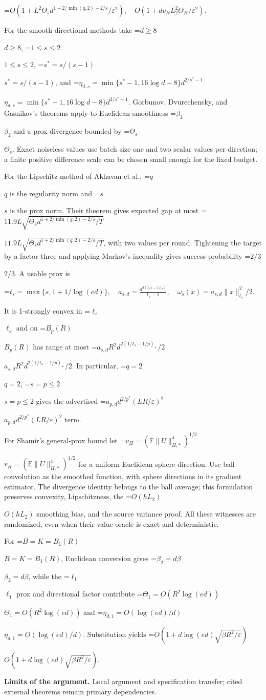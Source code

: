 \documentclass[10pt,a4paper]{article}
\newcommand{\AtlasMath}[1]{\par\begingroup\centering\setbox0=\hbox{$\displaystyle #1$}\ifdim\wd0>1.4\linewidth\typeout{ATLAS WIDE FORMULA: \the\wd0}\fi\ifdim\wd0>\linewidth\resizebox{\linewidth}{!}{\box0}\else\box0\fi\par\endgroup}
\newcommand{\AtlasInlineMath}[1]{\begingroup\setbox0=\hbox{$#1$}\ifdim\wd0>.4\linewidth\endgroup\AtlasMath{#1}\else\endgroup$#1$\fi}
\begin{document}
\AtlasMath{O(1+L^2\Theta_s d^{1+2/\min(q,2)-2/s}/\varepsilon^2),\quad O(1+dv_H L_2^2\Theta_H/\varepsilon^2).}


For the smooth directional methods take \AtlasInlineMath{d\ge8}, \AtlasInlineMath{1\le s\le2}, \AtlasInlineMath{s^*=s/(s-1)}, and \AtlasInlineMath{\eta_{d,s}=\min\{s^*-1,16\log d-8\}d^{2/s^*-1}}. Gorbunov, Dvurechensky, and Gasnikov's theorems apply to Euclidean smoothness \AtlasInlineMath{\beta_2} and a prox divergence bounded by \AtlasInlineMath{\Theta_s}. Exact noiseless values use batch size one and two scalar values per direction; a finite positive difference scale can be chosen small enough for the fixed budget.

For the Lipschitz method of Akhavan et al., \AtlasInlineMath{q} is the regularity norm and \AtlasInlineMath{s} is the prox norm. Their theorem gives expected gap at most \AtlasInlineMath{11.9L\sqrt{\Theta_s d^{1+2/\min(q,2)-2/s}/T}}, with two values per round. Tightening the target by a factor three and applying Markov's inequality gives success probability \AtlasInlineMath{2/3}. A usable prox is

\AtlasMath{t_s=\max\{s,1+1/\log(ed)\},\quad a_{s,d}=\frac{d^{2(1/s-1/t_s)}}{t_s-1},\quad\omega_s(x)=a_{s,d}\|x\|_{t_s}^2/2.}

It is 1-strongly convex in \AtlasInlineMath{\ell_s} and on \AtlasInlineMath{B_p(R)} has range at most \AtlasInlineMath{a_{s,d}R^2d^{2(1/t_s-1/p)_+}/2}. In particular, \AtlasInlineMath{q=2}, \AtlasInlineMath{s=p\le2} gives the advertised \AtlasInlineMath{a_{p,d}d^{2/p^*}(LR/\varepsilon)^2} term.

For Shamir's general-prox bound let \AtlasInlineMath{v_H=(\mathbb E\|U\|_{H,*}^4)^{1/2}} for a uniform Euclidean sphere direction. Use ball convolution as the smoothed function, with sphere directions in its gradient estimator. The divergence identity belongs to the ball average; this formulation preserves convexity, Lipschitzness, the \AtlasInlineMath{O(hL_2)} smoothing bias, and the source variance proof. All these witnesses are randomized, even when their value oracle is exact and deterministic.

For \AtlasInlineMath{B=K=B_1(R)}, Euclidean conversion gives \AtlasInlineMath{\beta_2=d\beta}, while the \AtlasInlineMath{\ell_1} prox and directional factor contribute \AtlasInlineMath{\Theta_1=O(R^2\log(ed))} and \AtlasInlineMath{\eta_{d,1}=O(\log(ed)/d)}. Substitution yields \AtlasInlineMath{O(1+d\log(ed)\sqrt{\beta R^2/\varepsilon})}.

\textbf{Limits of the argument.} Local argument and specification transfer; cited external theorems remain primary dependencies.
\end{document}
